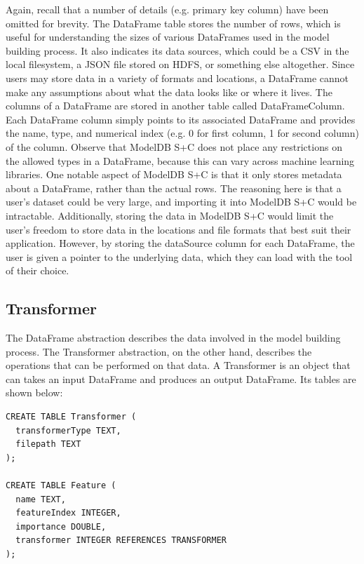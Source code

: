 Again, recall that a number of details (e.g. primary key column) have been omitted
for brevity. The DataFrame table stores the number of rows, which is useful for
understanding the sizes of various DataFrames used in the model building process.
It also indicates its data sources, which could be a CSV in the local filesystem,
a JSON file stored on HDFS, or something else altogether. Since users may store
data in a variety of formats and locations, a DataFrame cannot make any assumptions
about what the data looks like or where it lives. The columns of a DataFrame
are stored in another table called DataFrameColumn. Each DataFrame column simply
points to its associated DataFrame and provides the name, type, and numerical index
(e.g. 0 for first column, 1 for second column) of the column. Observe that ModelDB S+C does
not place any restrictions on the allowed types in a DataFrame, because this
can vary across machine learning libraries. One notable aspect of ModelDB S+C
is that it only stores metadata about a DataFrame, rather than the actual rows.
The reasoning here is that a user's dataset could be very large, and importing it
into ModelDB S+C would be intractable. Additionally, storing the data in ModelDB
S+C would limit the user's freedom to store data in the locations and file formats
that best suit their application. However, by storing the dataSource column for
each DataFrame, the user is given a pointer to the underlying data, which they can
load with the tool of their choice.

\subsection{Transformer} 
The DataFrame abstraction describes the data involved in the model building process.
The Transformer abstraction, on the other hand, describes the operations that can
be performed on that data. A Transformer is an object that can takes an input DataFrame
and produces an output DataFrame. Its tables are shown below:

\begin{verbatim}
CREATE TABLE Transformer (
  transformerType TEXT,
  filepath TEXT
);

CREATE TABLE Feature (
  name TEXT,
  featureIndex INTEGER,
  importance DOUBLE,
  transformer INTEGER REFERENCES TRANSFORMER
);
\end{verbatim}

